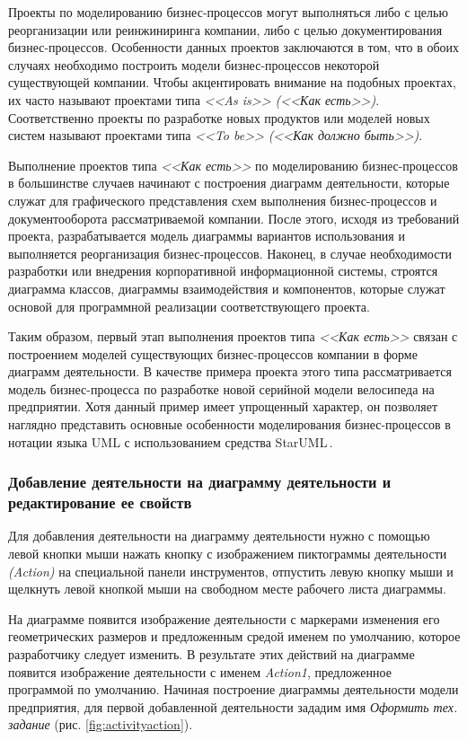 \documentclass[a4paper,12pt]{extreport}
\newcommand{\staruml}{StarUML\,\tm}
\begin{document}
Проекты по моделированию бизнес-процессов могут выполняться либо с целью реорганизации или реинжиниринга компании, либо с целью документирования бизнес-процессов. Особенности данных проектов заключаются в том, что в обоих случаях необходимо построить модели бизнес-процессов некоторой существующей компании. Чтобы акцентировать внимание на подобных проектах, их часто называют проектами типа \textit{<<As is>> (<<Как есть>>)}. Соответственно проекты по разработке новых продуктов или моделей новых систем называют проектами типа \textit{<<To be>>} \textit{(<<Как должно быть>>)}.

Выполнение проектов типа\textit{ <<Как есть>>} по моделированию бизнес-процессов в большинстве случаев начинают с построения диаграмм деятельности, которые служат для графического представления схем выполнения бизнес-процессов и документооборота рассматриваемой компании. После этого, исходя из требований проекта, разрабатывается модель диаграммы вариантов использования и выполняется реорганизация бизнес-процессов. Наконец, в случае необходимости разработки или внедрения корпоративной информационной системы, строятся диаграмма классов, диаграммы взаимодействия и компонентов, которые служат основой для программной реализации соответствующего проекта.

Таким образом, первый этап выполнения проектов типа \textit{<<Как есть>>} связан с построением моделей существующих бизнес-процессов компании в форме диаграмм деятельности. В качестве примера проекта этого типа рассматривается модель бизнес-процесса по разработке новой серийной модели велосипеда на предприятии. Хотя данный пример имеет упрощенный характер, он позволяет наглядно представить основные особенности моделирования бизнес-процессов в нотации языка UML с использованием средства \staruml.

\subsubsection*{Добавление деятельности на диаграмму деятельности и редактирование ее свойств}
Для добавления деятельности на диаграмму деятельности нужно с помощью левой кнопки мыши нажать кнопку с изображением пиктограммы деятельности \textit{(Action)} на специальной панели инструментов, отпустить левую кнопку мыши и щелкнуть левой кнопкой мыши на свободном месте рабочего листа диаграммы. 

На диаграмме появится изображение деятельности с маркерами изменения его геометрических размеров и предложенным средой именем по умолчанию, которое разработчику следует изменить. В результате этих действий на диаграмме появится изображение деятельности с именем \textit{Action1}, предложенное программой по умолчанию. Начиная построение диаграммы деятельности модели предприятия, для первой добавленной деятельности зададим имя \textit{Оформить тех. задание} (рис. \ref{fig:activityaction}).
\end{document}

